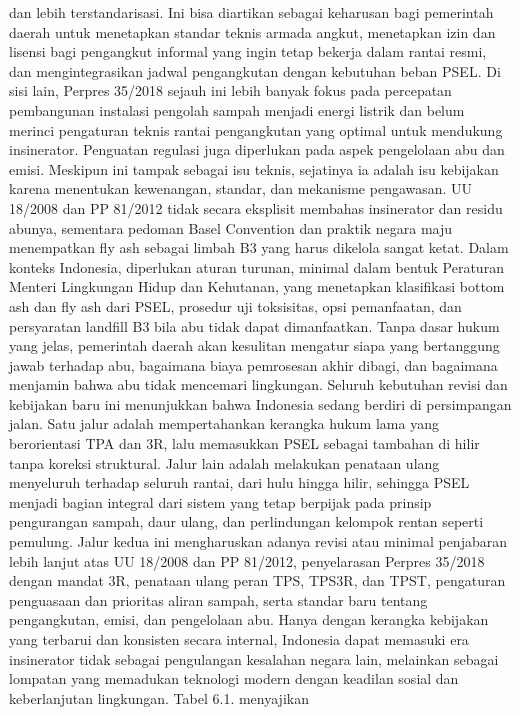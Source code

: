 \documentclass[
  letterpaper,
  DIV=11,
  numbers=noendperiod]{scrreprt}
\begin{document}
dan lebih terstandarisasi. Ini bisa diartikan sebagai keharusan bagi
pemerintah daerah untuk menetapkan standar teknis armada angkut,
menetapkan izin dan lisensi bagi pengangkut informal yang ingin tetap
bekerja dalam rantai resmi, dan mengintegrasikan jadwal pengangkutan
dengan kebutuhan beban PSEL. Di sisi lain, Perpres 35/2018 sejauh ini
lebih banyak fokus pada percepatan pembangunan instalasi pengolah sampah
menjadi energi listrik dan belum merinci pengaturan teknis rantai
pengangkutan yang optimal untuk mendukung insinerator. Penguatan
regulasi juga diperlukan pada aspek pengelolaan abu dan emisi. Meskipun
ini tampak sebagai isu teknis, sejatinya ia adalah isu kebijakan karena
menentukan kewenangan, standar, dan mekanisme pengawasan. UU 18/2008 dan
PP 81/2012 tidak secara eksplisit membahas insinerator dan residu
abunya, sementara pedoman Basel Convention dan praktik negara maju
menempatkan fly ash sebagai limbah B3 yang harus dikelola sangat ketat.
Dalam konteks Indonesia, diperlukan aturan turunan, minimal dalam bentuk
Peraturan Menteri Lingkungan Hidup dan Kehutanan, yang menetapkan
klasifikasi bottom ash dan fly ash dari PSEL, prosedur uji toksisitas,
opsi pemanfaatan, dan persyaratan landfill B3 bila abu tidak dapat
dimanfaatkan. Tanpa dasar hukum yang jelas, pemerintah daerah akan
kesulitan mengatur siapa yang bertanggung jawab terhadap abu, bagaimana
biaya pemrosesan akhir dibagi, dan bagaimana menjamin bahwa abu tidak
mencemari lingkungan. Seluruh kebutuhan revisi dan kebijakan baru ini
menunjukkan bahwa Indonesia sedang berdiri di persimpangan jalan. Satu
jalur adalah mempertahankan kerangka hukum lama yang berorientasi TPA
dan 3R, lalu memasukkan PSEL sebagai tambahan di hilir tanpa koreksi
struktural. Jalur lain adalah melakukan penataan ulang menyeluruh
terhadap seluruh rantai, dari hulu hingga hilir, sehingga PSEL menjadi
bagian integral dari sistem yang tetap berpijak pada prinsip pengurangan
sampah, daur ulang, dan perlindungan kelompok rentan seperti pemulung.
Jalur kedua ini mengharuskan adanya revisi atau minimal penjabaran lebih
lanjut atas UU 18/2008 dan PP 81/2012, penyelarasan Perpres 35/2018
dengan mandat 3R, penataan ulang peran TPS, TPS3R, dan TPST, pengaturan
penguasaan dan prioritas aliran sampah, serta standar baru tentang
pengangkutan, emisi, dan pengelolaan abu. Hanya dengan kerangka
kebijakan yang terbarui dan konsisten secara internal, Indonesia dapat
memasuki era insinerator tidak sebagai pengulangan kesalahan negara
lain, melainkan sebagai lompatan yang memadukan teknologi modern dengan
keadilan sosial dan keberlanjutan lingkungan. Tabel 6.1. menyajikan
\end{document}

